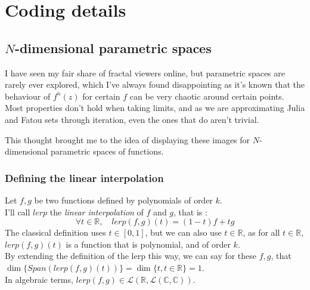 \documentclass{article}
\newcommand\R{\mathbb{R}}
\newcommand\C{\mathbb{C}}
\begin{document}
\section{Coding details}

\subsection{$N$-dimensional parametric spaces}

I have seen my fair share of fractal viewers online, but parametric spaces are rarely ever explored, which I've always found disappointing as it's known that the behaviour of $f^n(z)$ for certain $f$ can be very chaotic around certain points. \\
Most properties don't hold when taking limits, and as we are approximating Julia and Fatou sets through iteration, even the ones that do aren't trivial. \\
\vspace{5mm}

This thought brought me to the idea of displaying these images for $N$-dimensional parametric spaces of functions. \\
\vspace{5mm}

\subsubsection{Defining the linear interpolation}

Let $f, g$ be two functions defined by polynomials of order $k$. \\
I'll call $lerp$ the \textit{linear interpolation} of $f$ and $g$, that is : \\
\begin{equation}
\forall t \in \R, \quad lerp(f,g)(t) = (1-t)f + tg
\end{equation}
The classical definition uses $t \in [0,1]$, but we can also use $t \in \R$, as for all $t \in \R$, $lerp(f,g)(t)$ is a function that is polynomial, and of order $k$. \\
\vspace{5mm}
By extending the definition of the lerp this way, we can say for these $f,g$, that $\dim \lbrace Span(lerp(f,g)(t)) \rbrace = \dim \lbrace t, t \in \R \rbrace = 1$. \\
In algebraic terms, $lerp(f,g) \in \mathcal{L}(\R, \mathcal{L}(\C, \C))$. \\
\vspace{5mm}
\end{document}
